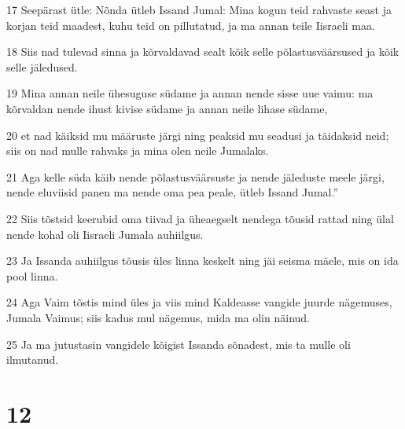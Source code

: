 \par 17 Seepärast ütle: Nõnda ütleb Issand Jumal: Mina kogun teid rahvaste seast ja korjan teid maadest, kuhu teid on pillutatud, ja ma annan teile Iisraeli maa.
\par 18 Siis nad tulevad sinna ja kõrvaldavad sealt kõik selle põlastusväärsused ja kõik selle jäledused.
\par 19 Mina annan neile ühesuguse südame ja annan nende sisse uue vaimu: ma kõrvaldan nende ihust kivise südame ja annan neile lihase südame,
\par 20 et nad käiksid mu määruste järgi ning peaksid mu seadusi ja täidaksid neid; siis on nad mulle rahvaks ja mina olen neile Jumalaks.
\par 21 Aga kelle süda käib nende põlastusväärsuste ja nende jäleduste meele järgi, nende eluviisid panen ma nende oma pea peale, ütleb Issand Jumal.”
\par 22 Siis tõstsid keerubid oma tiivad ja üheaegselt nendega tõusid rattad ning ülal nende kohal oli Iisraeli Jumala auhiilgus.
\par 23 Ja Issanda auhiilgus tõusis üles linna keskelt ning jäi seisma mäele, mis on ida pool linna.
\par 24 Aga Vaim tõstis mind üles ja viis mind Kaldeasse vangide juurde nägemuses, Jumala Vaimus; siis kadus mul nägemus, mida ma olin näinud.
\par 25 Ja ma jutustasin vangidele kõigist Issanda sõnadest, mis ta mulle oli ilmutanud.

\chapter{12}

